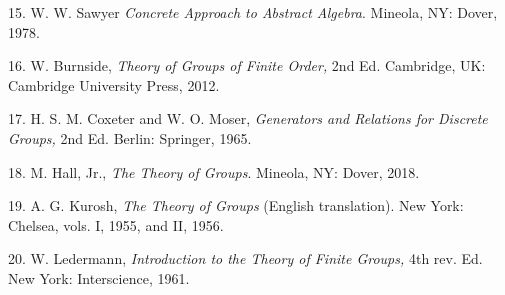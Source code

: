 \documentclass[11pt,oneside]{article}
\begin{document}
\begin{BookBody}
15. W. W. Sawyer \textit{Concrete Approach to Abstract Algebra}. Mineola, NY: Dover, 1978.


16. W. Burnside,\textit{ Theory of Groups of Finite Order,} 2nd Ed. Cambridge, UK: Cambridge University Press, 2012.

17. H. S. M. Coxeter and W. O. Moser,\textit{ Generators and Relations for Discrete Groups,} 2nd Ed. Berlin: Springer, 1965.

18. M. Hall, Jr.,\textit{ The Theory of Groups}. Mineola, NY: Dover, 2018.

19. A. G. Kurosh,\textit{ The Theory of Groups} (English translation). New York: Chelsea, vols. I, 1955, and II, 1956.

20. W. Ledermann,\textit{ Introduction to the Theory of Finite Groups,} 4th rev. Ed. New York: Interscience, 1961.

\end{BookBody}

\BookNarrativetrue
\end{document}
